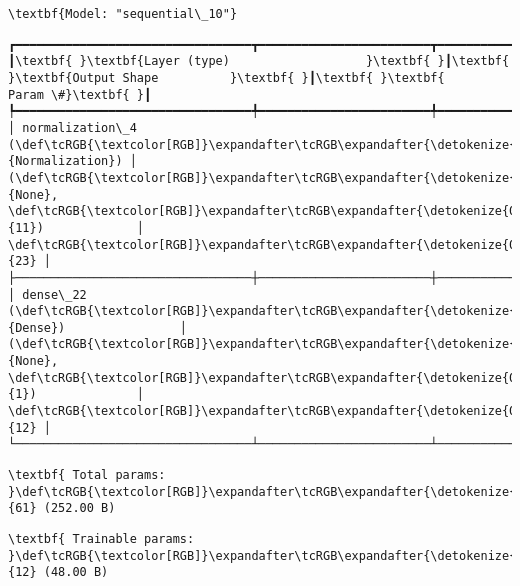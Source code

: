 \documentclass[11pt]{article}
\begin{document}
    
    \begin{Verbatim}[commandchars=\\\{\}]
\textbf{Model: "sequential\_10"}

    \end{Verbatim}

    
    
    \begin{Verbatim}[commandchars=\\\{\}]
┏━━━━━━━━━━━━━━━━━━━━━━━━━━━━━━━━━┳━━━━━━━━━━━━━━━━━━━━━━━━┳━━━━━━━━━━━━━━━┓
┃\textbf{ }\textbf{Layer (type)                   }\textbf{ }┃\textbf{ }\textbf{Output Shape          }\textbf{ }┃\textbf{ }\textbf{      Param \#}\textbf{ }┃
┡━━━━━━━━━━━━━━━━━━━━━━━━━━━━━━━━━╇━━━━━━━━━━━━━━━━━━━━━━━━╇━━━━━━━━━━━━━━━┩
│ normalization\_4 (\def\tcRGB{\textcolor[RGB]}\expandafter\tcRGB\expandafter{\detokenize{0,135,255}}{Normalization}) │ (\def\tcRGB{\textcolor[RGB]}\expandafter\tcRGB\expandafter{\detokenize{0,215,255}}{None}, \def\tcRGB{\textcolor[RGB]}\expandafter\tcRGB\expandafter{\detokenize{0,175,0}}{11})             │            \def\tcRGB{\textcolor[RGB]}\expandafter\tcRGB\expandafter{\detokenize{0,175,0}}{23} │
├─────────────────────────────────┼────────────────────────┼───────────────┤
│ dense\_22 (\def\tcRGB{\textcolor[RGB]}\expandafter\tcRGB\expandafter{\detokenize{0,135,255}}{Dense})                │ (\def\tcRGB{\textcolor[RGB]}\expandafter\tcRGB\expandafter{\detokenize{0,215,255}}{None}, \def\tcRGB{\textcolor[RGB]}\expandafter\tcRGB\expandafter{\detokenize{0,175,0}}{1})              │            \def\tcRGB{\textcolor[RGB]}\expandafter\tcRGB\expandafter{\detokenize{0,175,0}}{12} │
└─────────────────────────────────┴────────────────────────┴───────────────┘

    \end{Verbatim}

    
    
    \begin{Verbatim}[commandchars=\\\{\}]
\textbf{ Total params: }\def\tcRGB{\textcolor[RGB]}\expandafter\tcRGB\expandafter{\detokenize{0,175,0}}{61} (252.00 B)

    \end{Verbatim}

    
    
    \begin{Verbatim}[commandchars=\\\{\}]
\textbf{ Trainable params: }\def\tcRGB{\textcolor[RGB]}\expandafter\tcRGB\expandafter{\detokenize{0,175,0}}{12} (48.00 B)

    \end{Verbatim}
\end{document}
